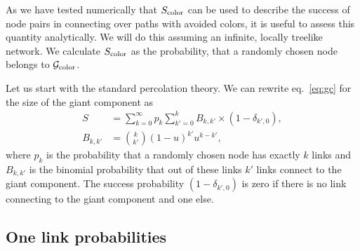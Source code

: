 \documentclass[aps, pre, onecolumn, a4paper, floatfix]{revtex4}
\begin{document}
As we have tested numerically that $S_{\rm color}$ can be used to describe the success of node 
pairs in connecting over paths with avoided colors, it is useful to assess this quantity 
analytically. We will do this assuming an infinite, locally treelike network. 
We calculate $S_{\rm color}$ as the probability, that a randomly chosen node belongs to 
${\mathcal G}_{\rm color}$. 

Let us start with the standard percolation theory. We can rewrite eq.~\ref{eq:gc} for the size of 
the giant component as 
\begin{align}
S &= \sum_{k=0}^{\infty}p_k \sum_{k'=0}^{k} B_{k,k'} \times \left( 1-\delta_{k',0}\right),\\
B_{k,k'} &={k \choose k'}(1-u)^{k'}u^{k-k'},
\end{align}
where $p_k$ is the probability that a randomly chosen node has exactly $k$ links and $B_{k,k'}$
is the binomial probability that out of these links $k'$ links connect to the giant component. The 
success probability $\left( 1-\delta_{k',0}\right)$ is zero 
if there is no link connecting to the giant component and one else. 


\subsection{One link probabilities}
\end{document}
